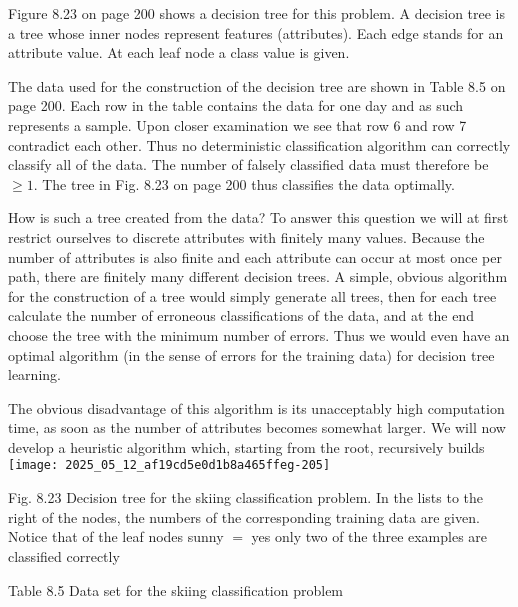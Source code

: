 \documentclass[10pt]{article}
\begin{document}
Figure 8.23 on page 200 shows a decision tree for this problem. A decision tree is a tree whose inner nodes represent features (attributes). Each edge stands for an attribute value. At each leaf node a class value is given.

The data used for the construction of the decision tree are shown in Table 8.5 on page 200. Each row in the table contains the data for one day and as such represents a sample. Upon closer examination we see that row 6 and row 7 contradict each other. Thus no deterministic classification algorithm can correctly classify all of the data. The number of falsely classified data must therefore be $\geq 1$. The tree in Fig. 8.23 on page 200 thus classifies the data optimally.

How is such a tree created from the data? To answer this question we will at first restrict ourselves to discrete attributes with finitely many values. Because the number of attributes is also finite and each attribute can occur at most once per path, there are finitely many different decision trees. A simple, obvious algorithm for the construction of a tree would simply generate all trees, then for each tree calculate the number of erroneous classifications of the data, and at the end choose the tree with the minimum number of errors. Thus we would even have an optimal algorithm (in the sense of errors for the training data) for decision tree learning.

The obvious disadvantage of this algorithm is its unacceptably high computation time, as soon as the number of attributes becomes somewhat larger. We will now develop a heuristic algorithm which, starting from the root, recursively builds\\
\texttt{[image: 2025\_05\_12\_af19cd5e0d1b8a465ffeg-205]}

Fig. 8.23 Decision tree for the skiing classification problem. In the lists to the right of the nodes, the numbers of the corresponding training data are given. Notice that of the leaf nodes sunny $=$ yes only two of the three examples are classified correctly

Table 8.5 Data set for the skiing classification problem
\end{document}

